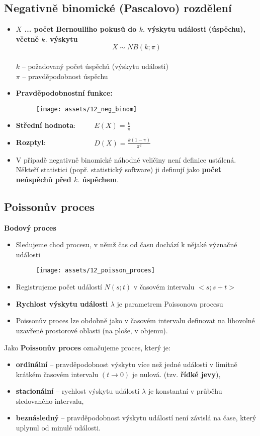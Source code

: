 \subsection{Negativně binomické (Pascalovo) rozdělení}
\begin{itemize}
    \item \textbf{$X$ ... počet Bernoulliho pokusů do $k.$ výskytu události (úspěchu), včetně $k.$ výskytu}
          $$X \sim NB(k;\pi)$$ \\ $k$ -- požadovaný počet úspěchů (výskytu události) \\ $\pi$ -- pravděpodobnost úspěchu
    \item \textbf{Pravděpodobnostní funkce:}
          \begin{figure}[H]
              \centering
              \texttt{[image: assets/12\_neg\_binom]}
          \end{figure}
    \item \textbf{Střední hodnota}: $\qquad$ $E(X) = \frac{k}{\pi}$
    \item \textbf{Rozptyl}: $\qquad\qquad\qquad\;\; D(X) = \frac{k(1- \pi)}{\pi^2}$
    \item V případě negativně binomické náhodné veličiny není definice ustálená. Někteří statistici (popř. statistický software) ji definují jako \textbf{počet neúspěchů před $k.$ úspěchem}.
\end{itemize}

\subsection{Poissonův proces}
\textbf{Bodový proces}
\begin{itemize}
    \item Sledujeme chod procesu, v němž čas od času dochází k nějaké význačné události \\
          \begin{figure}[H]
              \centering
              \texttt{[image: assets/12\_poisson\_proces]}
          \end{figure}
    \item Registrujeme počet událostí $N(s;t)$ v časovém intervalu $<s;s + t>$
    \item \textbf{Rychlost výskytu události $\lambda$} je parametrem Poissonova procesu
    \item Poissonův proces lze obdobně jako v časovém intervalu definovat na libovolné uzavřené prostorové oblasti (na ploše, v objemu).
\end{itemize}
Jako \textbf{Poissonův proces} označujeme proces, který je:
\begin{itemize}
    \item \textbf{ordinální} -- pravděpodobnost výskytu více než jedné události v limitně krátkém časovém intervalu $(t \to 0)$ je nulová. (tzv. \textbf{řídké jevy}),
    \item \textbf{stacionální} -- rychlost výskytu událostí $\lambda$ je konstantní v průběhu sledovaného intervalu,
    \item \textbf{beznásledný} -- pravděpodobnost výskytu událostí není závislá na čase, který uplynul od minulé události.
\end{itemize}

